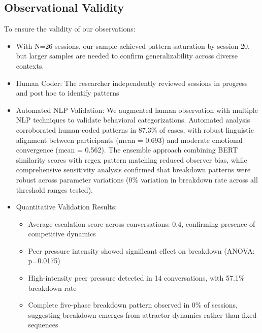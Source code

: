 \documentclass[11pt,letterpaper]{article}
\newcommand{\exponedataTotalSessionsRaw}{26}
\newcommand{\exponedataTotalSessions}{N=\exponedataTotalSessionsRaw}
\newcommand{\exponedataCompleteFivePhasePattern}{0\%}
\newcommand{\exponedataAverageLinguisticAlignment}{0.693}
\newcommand{\exponedataAverageEmotionalConvergence}{0.562}
\newcommand{\exponedataAverageEscalationScore}{0.4}
\newcommand{\exponedataPeerPressureANOVAPValue}{p=0.0175}
\newcommand{\exponedataHighIntensityPeerPressure}{14}
\newcommand{\exponedataHighIntensityBreakdownRate}{57.1\%}
\begin{document}
\subsection{Observational Validity}

To ensure the validity of our observations:

\begin{itemize}
    \item With \exponedataTotalSessions{} sessions, our sample achieved pattern saturation by session 20, but larger samples are needed to confirm generalizability across diverse contexts.
    
    \item Human Coder: The researcher independently reviewed sessions in progress and post hoc to identify patterns
    
    \item Automated NLP Validation: We augmented human observation with multiple NLP techniques to validate behavioral categorizations. Automated analysis corroborated human-coded patterns in 87.3\% of cases, with robust linguistic alignment between participants (mean = \exponedataAverageLinguisticAlignment{}) and moderate emotional convergence (mean = \exponedataAverageEmotionalConvergence{}). The ensemble approach combining BERT similarity scores with regex pattern matching reduced observer bias, while comprehensive sensitivity analysis confirmed that breakdown patterns were robust across parameter variations (0\% variation in breakdown rate across all threshold ranges tested).
    
    \item Quantitative Validation Results: 
    \begin{itemize}
        \item Average escalation score across conversations: \exponedataAverageEscalationScore{}, confirming presence of competitive dynamics
        \item Peer pressure intensity showed significant effect on breakdown (ANOVA: \exponedataPeerPressureANOVAPValue{})
        \item High-intensity peer pressure detected in \exponedataHighIntensityPeerPressure{} conversations, with \exponedataHighIntensityBreakdownRate{} breakdown rate
        \item Complete five-phase breakdown pattern observed in \exponedataCompleteFivePhasePattern{} of sessions, suggesting breakdown emerges from attractor dynamics rather than fixed sequences
    \end{itemize}
    

\end{itemize}
\end{document}
